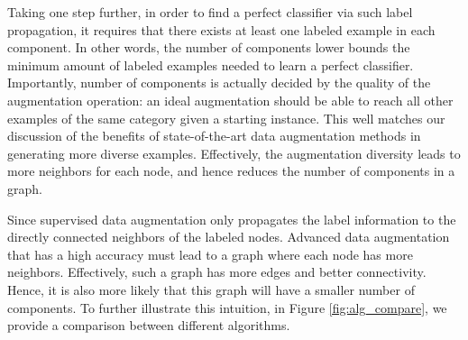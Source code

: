 \documentclass{article}
\begin{document}
Taking one step further, in order to find a perfect classifier via such label propagation, it requires that there exists at least one labeled example in each component.
In other words, the number of components lower bounds the minimum amount of labeled examples needed to learn a perfect classifier.
Importantly, number of components is actually decided by the quality of the augmentation operation: an ideal augmentation should be able to reach all other examples of the same category given a starting instance.
This well matches our discussion of the benefits of state-of-the-art data augmentation methods in generating more diverse examples.
Effectively, the augmentation diversity leads to more neighbors for each node, and hence reduces the number of components in a graph. 

Since supervised data augmentation only propagates the label information to the directly connected neighbors of the labeled nodes.
Advanced data augmentation that has a high accuracy must lead to a graph where each node has more neighbors. Effectively, such a graph has more edges and better connectivity. Hence, it is also more likely that this graph will have a smaller number of components. 
To further illustrate this intuition, in Figure \ref{fig:alg_compare}, we provide a comparison between different algorithms.
\end{document}
